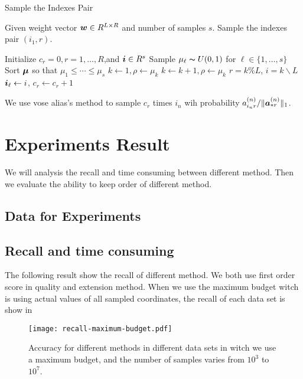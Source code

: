 \documentclass[letterpaper]{article}
\newcommand{\Sca}[3]{{#1}^{(#2)}_{i_#2#3}}%
\newcommand{\V}[1]{{\bm{{\MakeLowercase{#1}}}}}
\newcommand{\VnC}[3]{\V{#1}^{(#2)}_{#3}}
\newcommand{\Nrocl}[2]{\norm{\VnC{a}{#1}{*#2}}{1}}
\newcommand{\norm}[2]{\|#1\|_{#2}}
\begin{document}
\begin{algorithm}[ht]
    \caption{Sample the Indexes Pair}
    \label{alg:Pickedge}
    Given weight vector $\V{W}\in R^{L\times R}$ and number of samples $s$. Sample the indexes pair $(i_1,r)$.
    \begin{algorithmic}[1]
    \State Initialize $c_r=0,r=1,\ldots,R$,and $\V{i}\in R^s$
    \State Sample $\mu_{\ell} \thicksim U(0,1)$ for $\ell \in \{1,\ldots,s\}$
    \State Sort $\V{\mu}$ so that $\mu_1 \leq \cdots\leq\mu_s$
    \State $k \leftarrow 1,\rho \leftarrow \mu_k$
    \While {$\mu_{\ell} > \rho$}
    \State $k \leftarrow k+1,\rho \leftarrow \mu_k$
    \EndWhile
    \State $r = k \% L$, $i = k \backslash L$
    \State $\V{i}_{\ell} \leftarrow i$, $c_r\leftarrow c_r + 1$
    \EndFor
    \end{algorithmic}
\end{algorithm}

We use vose alias's method to sample $c_r$ times $i_n$ wih probability ${\Sca{a}{n}{r}}/\Nrocl{n}{r}$.

\section{Experiments Result}
We will analysis the recall and time consuming  between different method. Then we evaluate the ability to keep order of different method.
\subsection{Data for Experiments}

\subsection{Recall and time consuming}
The following result show the recall of different method. We both use first order score in quality and extension method.
When we use the maximum budget witch is using actual values of all sampled coordinates, the recall of each data set is show in ~

\begin{figure}[ht]
  \centering
  \texttt{[image: recall-maximum-budget.pdf]}\\
  \caption{Accuracy for different methods in different data sets in witch we use a maximum budget, and the number of samples varies from $10^3$ to $10^7$.}
  \label{Fig:RecallMaxBudget}
\end{figure}
\end{document}
